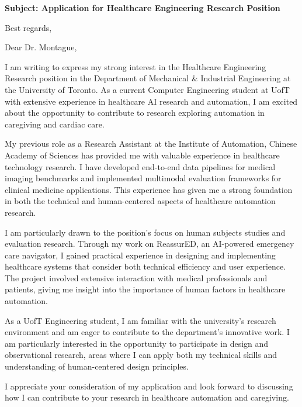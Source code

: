 \documentclass[11pt,a4paper,roman]{moderncv}
\begin{document}
\date{\today}
\opening{\textbf{Subject: Application for Healthcare Engineering Research Position}}
\closing{Best regards,}

\makelettertitle

Dear Dr. Montague,

I am writing to express my strong interest in the Healthcare Engineering Research position in the Department of Mechanical \& Industrial Engineering at the University of Toronto. As a current Computer Engineering student at UofT with extensive experience in healthcare AI research and automation, I am excited about the opportunity to contribute to research exploring automation in caregiving and cardiac care.

My previous role as a Research Assistant at the Institute of Automation, Chinese Academy of Sciences has provided me with valuable experience in healthcare technology research. I have developed end-to-end data pipelines for medical imaging benchmarks and implemented multimodal evaluation frameworks for clinical medicine applications. This experience has given me a strong foundation in both the technical and human-centered aspects of healthcare automation research.

I am particularly drawn to the position's focus on human subjects studies and evaluation research. Through my work on ReassurED, an AI-powered emergency care navigator, I gained practical experience in designing and implementing healthcare systems that consider both technical efficiency and user experience. The project involved extensive interaction with medical professionals and patients, giving me insight into the importance of human factors in healthcare automation.

As a UofT Engineering student, I am familiar with the university's research environment and am eager to contribute to the department's innovative work. I am particularly interested in the opportunity to participate in design and observational research, areas where I can apply both my technical skills and understanding of human-centered design principles.

I appreciate your consideration of my application and look forward to discussing how I can contribute to your research in healthcare automation and caregiving.

\makeletterclosing
\end{document}
